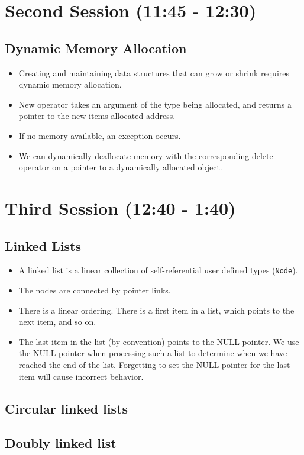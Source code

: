 \documentclass[11pt]{article}
\begin{document}
\section{Second Session (11:45 - 12:30)}
\label{sec-2}
\subsection{Dynamic Memory Allocation}
\label{sec-2-1}

\begin{itemize}
\item Creating and maintaining data structures that can grow or shrink requires dynamic memory allocation.
\item New operator takes an argument of the type being allocated, and returns a pointer to the new items allocated address.
\item If no memory available, an exception occurs.
\item We can dynamically deallocate memory with the corresponding delete operator on a pointer to a dynamically allocated object.
\end{itemize}
\section{Third Session (12:40 - 1:40)}
\label{sec-3}
\subsection{Linked Lists}
\label{sec-3-1}

\begin{itemize}
\item A linked list is a linear collection of self-referential user defined types (\verb~Node~).
\item The nodes are connected by pointer links.
\item There is a linear ordering.  There is a first item in a list, which points to the next item, and so on.
\item The last item in the list (by convention) points to the NULL pointer.  We use the NULL pointer when processing
  such a list to determine when we have reached the end of the list.  Forgetting to set the NULL pointer
  for the last item will cause incorrect behavior.
\end{itemize}
\subsection{Circular linked lists}
\label{sec-3-2}
\subsection{Doubly linked list}
\label{sec-3-3}
\end{document}
